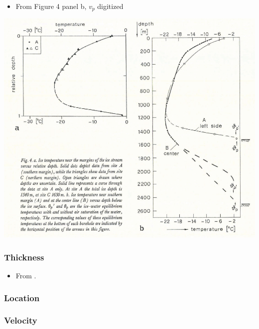 \documentclass[article,a4paper,times,11pt,twoside]{article}
\begin{document}
\begin{itemize}
\item From \textcite{iken_1993} Figure 4 panel b, \(v_p\) digitized
\end{itemize}
\begin{center}
\includegraphics[width=.9\linewidth]{jakobshavn_left/iken_1993_fig4.png}
\end{center}

\subsubsection{Thickness}
\label{sec:org79ebc39}

\begin{itemize}
\item From \textcite{iken_1993}.
\end{itemize}

\subsubsection{Location}
\label{sec:orgd80f458}

\subsubsection{Velocity}
\label{sec:org38f367d}
\clearpage
\end{document}
